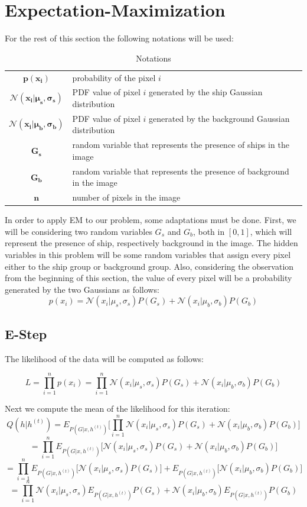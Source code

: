 \section{Expectation-Maximization}
For the rest of this section the following notations will be used:
\begin{table}[H]
	\centering
	\begin{tabular}{cp{}}
		$\mathbf{p(x_i)}$ & probability of the pixel $i$ \\ 
		$\mathbf{\mathcal{N} (x_i | \mu_s , \sigma_s)}$ & PDF value of pixel $i$ generated by the ship Gaussian distribution \\
		$\mathbf{\mathcal{N} (x_i | \mu_b , \sigma_b)}$ & PDF value of pixel $i$ generated by the background Gaussian distribution \\
		$\mathbf{G_s}$ & random variable that represents the presence of ships in the image\\
		$\mathbf{G_b}$ & random variable that represents the presence of background in the image\\
		$\mathbf{n}$ & number of pixels in the image 
	\end{tabular}
	\caption{Notations}\label{notations}
\end{table}
In order to apply EM to our problem, some adaptations must be done. First, we will be considering two random variables $G_s$ and $G_b$, both in $[0, 1]$, which will represent the presence of ship, respectively background in the image. The hidden variables in this problem will be some random variables that assign every pixel either to the ship group or background group. Also, considering the observation from the beginning of this section, the value of every pixel will be a probability generated by the two Gaussians as follows:
$$ p(x_i) = \mathcal{N}(x_i | \mu_s, \sigma_s) P(G_s) + \mathcal{N}(x_i | \mu_b, \sigma_b) P(G_b) $$

\subsection{E-Step}

The likelihood of the data will be computed as follows:

$$L = \prod_{i=1}^{n} p(x_i) = \prod_{i=1}^{n} \mathcal{N}(x_i | \mu_s, \sigma_s) P(G_s) + \mathcal{N}(x_i | \mu_b, \sigma_b) P(G_b)$$

Next we compute the mean of the likelihood for this iteration:
$$Q(h | h^{(t)}) = E_{P(G | x, h^{(t)})}\bigg[\prod_{i=1}^{n} \mathcal{N}(x_i | \mu_s, \sigma_s) P(G_s) + \mathcal{N}(x_i | \mu_b, \sigma_b) P(G_b)\bigg]$$
$$=\prod_{i=1}^{n} E_{P(G | x, h^{(t)})}\bigg[\mathcal{N}(x_i | \mu_s, \sigma_s) P(G_s) + \mathcal{N}(x_i | \mu_b, \sigma_b) P(G_b)\bigg] $$
$$=\prod_{i=1}^{n}E_{P(G | x, h^{(t)})}\bigg[\mathcal{N}(x_i | \mu_s, \sigma_s) P(G_s)\bigg] + E_{P(G | x, h^{(t)})}\bigg[\mathcal{N}(x_i | \mu_b, \sigma_b) P(G_b)\bigg] $$
$$=\prod_{i=1}^{n} \mathcal{N}(x_i | \mu_s, \sigma_s) E_{P(G | x, h^{(t)})} P(G_s) + \mathcal{N}(x_i | \mu_b, \sigma_b) E_{P(G | x, h^{(t)})} P(G_b) $$


